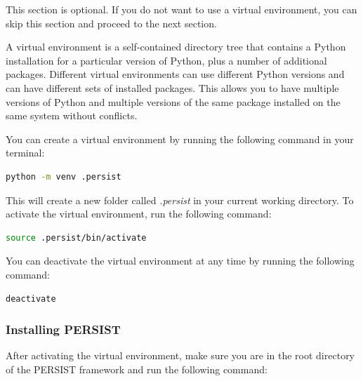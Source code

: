 \documentclass[
	a4paper, %
	12pt, %
]{persist}
\begin{document}
\begin{note}
	This section is optional. If you do not want to use a virtual environment, you can skip this section and proceed to the next section.
\end{note}

A virtual environment is a self-contained directory tree that contains a Python installation for a particular version of Python, plus a number of additional packages. Different virtual environments can use different Python versions and can have different sets of installed packages. This allows you to have multiple versions of Python and multiple versions of the same package installed on the same system without conflicts.

You can create a virtual environment by running the following command in your terminal:

\begin{lstlisting}[language=bash]
	python -m venv .persist
\end{lstlisting}

This will create a new folder called \emph{.persist} in your current working directory. To activate the virtual environment, run the following command:

\begin{lstlisting}[language=bash]
	source .persist/bin/activate
\end{lstlisting}

You can deactivate the virtual environment at any time by running the following command:

\begin{lstlisting}[language=bash]
	deactivate
\end{lstlisting}

\subsubsection{Installing PERSIST}

After activating the virtual environment, make sure you are in the root directory of the PERSIST framework and run the following command:
\end{document}
